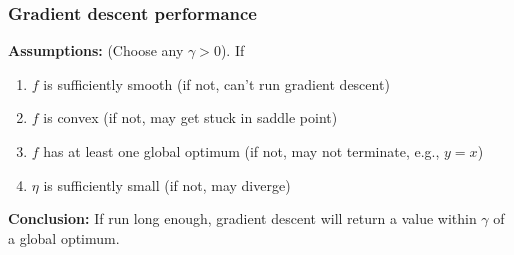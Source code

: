     \subsubsection{Gradient descent performance}
    \begin{theorem}

        \textbf{Assumptions:} (Choose any $\gamma > 0$). If
        \begin{enumerate}
            \item $f$ is sufficiently smooth (if not, can't run gradient descent)
            \item $f$ is convex (if not, may get stuck in saddle point)
            \item $f$ has at least one global optimum (if not, may not terminate, e.g., $y=x$)
            \item $\eta$ is sufficiently small (if not, may diverge)
        \end{enumerate}

        \textbf{Conclusion:} If run long enough, gradient descent will return a value within $\gamma$ of a global optimum.

    \end{theorem}

